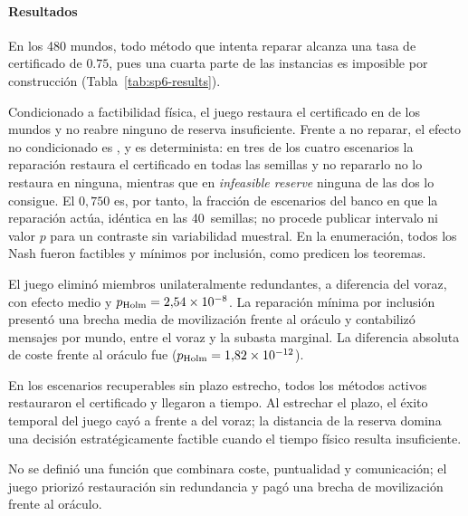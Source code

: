 \paragraph{Resultados}

En los 480 mundos, todo método que intenta reparar alcanza una tasa de certificado de $0.75$, pues una cuarta parte de las instancias es imposible por construcción (Tabla~\ref{tab:sp6-results}).

\begin{table}[!htbp]
  \centering
  \caption{Resultados agregados de E6-C sobre 480 mundos pareados por método.}
  \label{tab:sp6-results}
  \scriptsize
  \resizebox{\textwidth}{!}{}
  \viuownsource
\end{table}

Condicionado a factibilidad física, el juego restaura el certificado en \SPSixConditionalRestore{} de los mundos y no reabre ninguno de reserva insuficiente. Frente a no reparar, el efecto no condicionado es \SPSixHOneEffect{}, y es determinista: en tres de los cuatro escenarios la reparación restaura el certificado en todas las semillas y no repararlo no lo restaura en ninguna, mientras que en \emph{infeasible reserve} ninguna de las dos lo consigue. El $0{,}750$ es, por tanto, la fracción de escenarios del banco en que la reparación actúa, idéntica en las 40~semillas; no procede publicar intervalo ni valor $p$ para un contraste sin variabilidad muestral. En la enumeración, todos los Nash fueron factibles y mínimos por inclusión, como predicen los teoremas.

El juego eliminó miembros unilateralmente redundantes, a diferencia del voraz, con efecto medio \SPSixHTwoEffect{} y $p_{\mathrm{Holm}}=2{,}54\times10^{-8}$. La reparación mínima por inclusión presentó una brecha media de movilización \SPSixPotentialGap{} frente al oráculo y contabilizó \SPSixPotentialMessages{} mensajes por mundo, entre el voraz y la subasta marginal. La diferencia absoluta de coste frente al oráculo fue \SPSixHThreeEffect{} ($p_{\mathrm{Holm}}=1{,}82\times10^{-12}$).

En los escenarios recuperables sin plazo estrecho, todos los métodos activos restauraron el certificado y llegaron a tiempo. Al estrechar el plazo, el éxito temporal del juego cayó a \SPSixTightPotentialSuccess{} frente a \SPSixTightGreedySuccess{} del voraz; la distancia de la reserva domina una decisión estratégicamente factible cuando el tiempo físico resulta insuficiente.


No se definió una función que combinara coste, puntualidad y comunicación; el juego priorizó restauración sin redundancia y pagó una brecha de movilización frente al oráculo.

